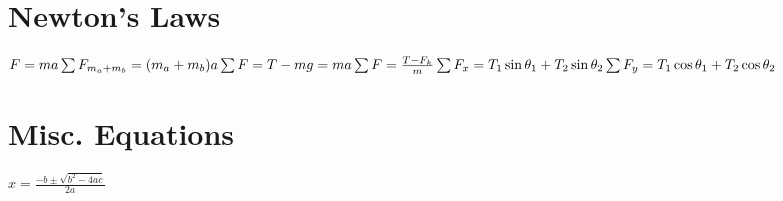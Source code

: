 \documentclass[11pt]{article}
\begin{document}
\begin{paracol}{3}
        \section*{Newton's Laws}
        \begin{fleqn}
            $
            F=ma \newline
            \sum F_{m_a+m_b} = (m_a+m_b)a \newline
            \sum F = T - mg = ma \newline
            \sum F = \frac{T-F_k}{m} \newline
            \sum F_x=T_1\sin\theta_1 + T_2\sin\theta_2 \newline
            \sum F_y=T_1\cos\theta_1 + T_2\cos\theta_2 \newline
            $
        \end{fleqn}
        \section*{Misc. Equations}
        \begin{fleqn}
            $
            x = \frac{-b \pm \sqrt{b^2-4ac}}{2a}
            $
        \end{fleqn}
    \end{paracol}
\end{document}
